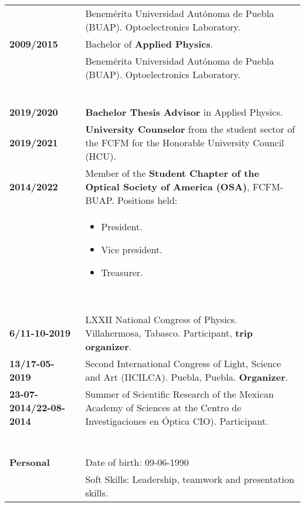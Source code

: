 \documentclass[twoside,letter,openright,10pt]{report}
\begin{document}
\begin{table}[hbt!]
\begin{tabular}{p{40mm}p{140mm}}
& Benemérita Universidad Autónoma de Puebla (BUAP). Optoelectronics Laboratory.
\\
\textbf{2009/2015} & Bachelor of \textbf{Applied Physics}.
\\
& Benemérita Universidad Autónoma de Puebla (BUAP). Optoelectronics Laboratory. 
\\
\multicolumn{2}{c}{\cellcolor{black} \textcolor{white}{Work experience}}
\\
\\
\textbf{2019/2020} & \textbf{Bachelor Thesis Advisor} in Applied Physics.
\\
\textbf{2019/2021} & \textbf{University Counselor} from the student sector of the FCFM for the Honorable University Council (HCU).
\\
\textbf{2014/2022} & Member of the  \textbf{Student Chapter of the Optical Society of America (OSA)}, FCFM-BUAP. Positions held:\\
& \vspace{-2mm} \begin{itemize}[noitemsep,nolistsep]
\item President.
\item Vice president.
\item Treasurer.
\vspace{-4mm}
\end{itemize}
\\
\multicolumn{2}{c}{\cellcolor{black} \textcolor{white}{Universitary experience}}
\\
\\
\textbf{6/11-10-2019} &LXXII National Congress of Physics. Villahermosa, Tabasco. Participant, \textbf{trip organizer}.
\\
\textbf{13/17-05-2019} &Second International Congress of Light, Science and Art (IICILCA). Puebla, Puebla. \textbf{Organizer}.
\\
\textbf{23-07-2014/22-08-2014} & Summer of Scientific Research of the Mexican Academy of Sciences at the Centro de Investigaciones en Óptica CIO). Participant.
\\
\\
\multicolumn{2}{c}{\cellcolor{black} \textcolor{white}{ Additional Information}}
\\
\\
\textbf{Personal} &  Date of birth: 09-06-1990
\\
& Soft Skills: Leadership, teamwork and presentation skills.

\end{tabular}
\end{table}
\end{document}
